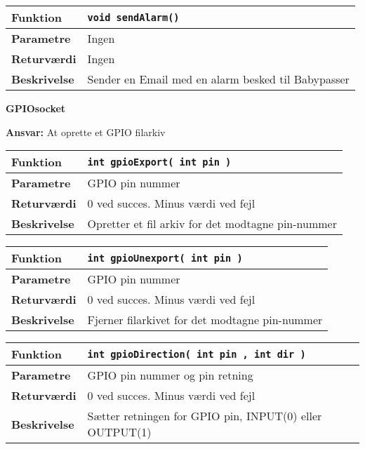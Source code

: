 \begin{center}
    \begin{tabular}{ | l | p{} |}
    \hline
    \textbf{Funktion}	& \verb+void sendAlarm() +							\\ \hline
    \textbf{Parametre} 	& Ingen												\\ \hline
    \textbf{Returværdi}	& Ingen												\\ \hline
    \textbf{Beskrivelse}	& Sender en Email med en alarm besked til Babypasser	\\ \hline
    \end{tabular}
\end{center}

{\centering
\textbf{GPIOsocket}\par
}
\textbf{Ansvar:} At oprette et GPIO filarkiv \

\begin{center}
    \begin{tabular}{ | l | p{} |}
    \hline
    \textbf{Funktion}	& \verb+int gpioExport( int pin ) +					\\ \hline
    \textbf{Parametre} 	& GPIO pin nummer									\\ \hline
    \textbf{Returværdi}	& 0 ved succes. Minus værdi ved fejl					\\ \hline
    \textbf{Beskrivelse}	& Opretter et fil arkiv for det modtagne pin-nummer	\\ \hline
    \end{tabular}
\end{center}

\begin{center}
    \begin{tabular}{ | l | p{} |}
    \hline
    \textbf{Funktion}	& \verb+int gpioUnexport( int pin ) +			\\ \hline
    \textbf{Parametre} 	& GPIO pin nummer								\\ \hline
    \textbf{Returværdi}	& 0 ved succes. Minus værdi ved fejl				\\ \hline
    \textbf{Beskrivelse}	& Fjerner filarkivet for det modtagne pin-nummer	\\ \hline
    \end{tabular}
\end{center}

\begin{center}
    \begin{tabular}{ | l | p{} |}
    \hline
    \textbf{Funktion}	& \verb+int gpioDirection( int pin , int dir ) +			\\ \hline
    \textbf{Parametre} 	& GPIO pin nummer og pin retning							\\ \hline
    \textbf{Returværdi}	& 0 ved succes. Minus værdi ved fejl						\\ \hline
    \textbf{Beskrivelse}	& Sætter retningen for GPIO pin, INPUT(0) eller OUTPUT(1)	\\ \hline
    \end{tabular}
\end{center}

